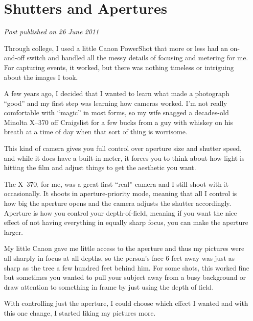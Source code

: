 \section{Shutters and Apertures}

\emph{Post published on 26 June 2011}

Through college, I used a little Canon PowerShot that more or less had
an on-and-off switch and handled all the messy details of focusing and
metering for me. For capturing events, it worked, but there was nothing
timeless or intriguing about the images I took.

A few years ago, I decided that I wanted to learn what made a photograph
``good'' and my first step was learning how cameras worked. I'm not
really comfortable with ``magic'' in most forms, so my wife snagged a
decades-old Minolta X--370 off Craigslist for a few bucks from a guy
with whiskey on his breath at a time of day when that sort of thing is
worrisome.

This kind of camera gives you full control over aperture size and
shutter speed, and while it does have a built-in meter, it forces you to
think about how light is hitting the film and adjust things to get the
aesthetic you want.


The X--370, for me, was a great first ``real'' camera and I still shoot
with it occasionally. It shoots in aperture-priority mode, meaning that
all I control is how big the aperture opens and the camera adjusts the
shutter accordingly. Aperture is how you control your depth-of-field,
meaning if you want the nice effect of not having everything in equally
sharp focus, you can make the aperture larger.

My little Canon gave me little access to the aperture and thus my
pictures were all sharply in focus at all depths, so the person's face 6
feet away was just as sharp as the tree a few hundred feet behind him.
For some shots, this worked fine but sometimes you wanted to pull your
subject away from a busy background or draw attention to something in
frame by just using the depth of field.

With controlling just the aperture, I could choose which effect I wanted
and with this one change, I started liking my pictures more.

